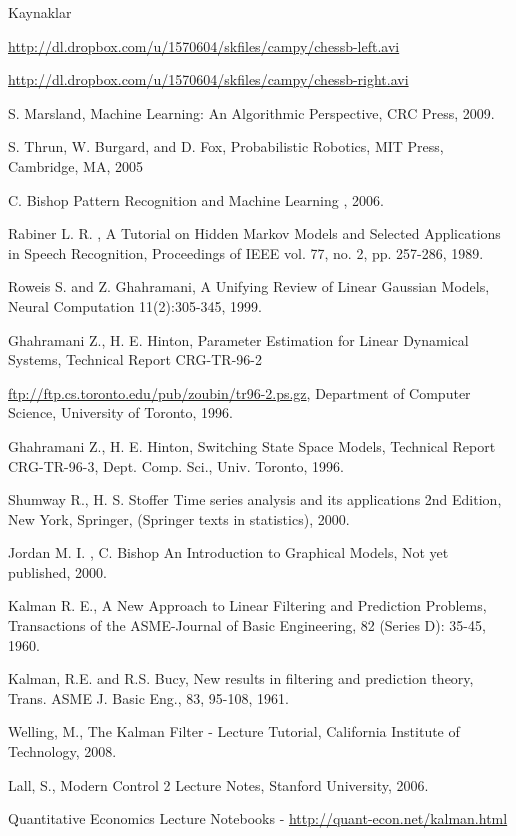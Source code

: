 \documentclass[12pt,fleqn]{article}\usepackage{../common}
\begin{document}
Kaynaklar

\url{http://dl.dropbox.com/u/1570604/skfiles/campy/chessb-left.avi}

\url{http://dl.dropbox.com/u/1570604/skfiles/campy/chessb-right.avi}

S. Marsland, Machine Learning: An Algorithmic Perspective, CRC Press,
2009.

S. Thrun, W. Burgard, and D. Fox, Probabilistic Robotics, MIT Press,
Cambridge, MA, 2005

C. Bishop Pattern Recognition and Machine Learning , 2006.

Rabiner L. R. , A Tutorial on Hidden Markov Models and Selected
Applications in Speech Recognition, Proceedings of IEEE vol. 77, no. 2,
pp. 257-286, 1989.

Roweis S. and Z. Ghahramani, A Unifying Review of Linear Gaussian Models,
Neural Computation 11(2):305-345, 1999.

Ghahramani Z., H. E. Hinton, Parameter Estimation for Linear Dynamical
Systems, Technical Report CRG-TR-96-2

\url{ftp://ftp.cs.toronto.edu/pub/zoubin/tr96-2.ps.gz}, Department of
Computer Science, University of Toronto, 1996.

Ghahramani Z., H. E. Hinton, Switching State Space Models, Technical Report
CRG-TR-96-3, Dept. Comp. Sci., Univ. Toronto, 1996. 

Shumway R., H. S. Stoffer Time series analysis and its applications 2nd
Edition, New York, Springer, (Springer texts in statistics), 2000. 

Jordan M. I. , C. Bishop An Introduction to Graphical Models, Not yet
published, 2000. 

Kalman R. E., A New Approach to Linear Filtering and Prediction Problems,
Transactions of the ASME-Journal of Basic Engineering, 82 (Series D):
35-45, 1960.

Kalman, R.E. and R.S. Bucy, New results in filtering and prediction theory,
Trans. ASME J. Basic Eng., 83, 95-108, 1961. 

Welling, M., The Kalman Filter - Lecture Tutorial, California Institute of
Technology, 2008. 

Lall, S., Modern Control 2 Lecture Notes, Stanford University, 2006.

Quantitative Economics Lecture Notebooks - \url{http://quant-econ.net/kalman.html}
\end{document}
